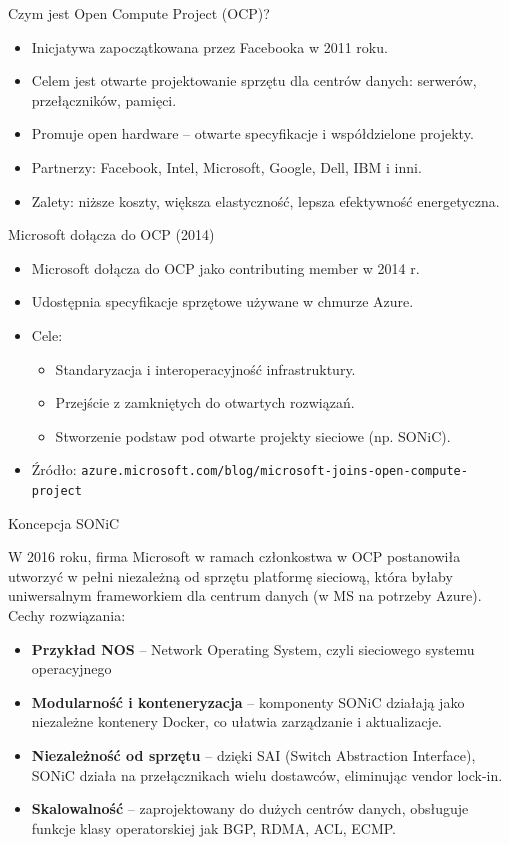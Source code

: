 \documentclass[aspectratio=169]{beamer}
\begin{document}
\begin{frame}{Czym jest Open Compute Project (OCP)?}
\begin{itemize}
    \item Inicjatywa zapoczątkowana przez Facebooka w 2011 roku.
    \item Celem jest otwarte projektowanie sprzętu dla centrów danych: serwerów, przełączników, pamięci.
    \item Promuje open hardware – otwarte specyfikacje i współdzielone projekty.
    \item Partnerzy: Facebook, Intel, Microsoft, Google, Dell, IBM i inni.
    \item Zalety: niższe koszty, większa elastyczność, lepsza efektywność energetyczna.
\end{itemize}
\end{frame}

\begin{frame}{Microsoft dołącza do OCP (2014)}
\begin{itemize}
    \item Microsoft dołącza do OCP jako contributing member w 2014 r.
    \item Udostępnia specyfikacje sprzętowe używane w chmurze Azure.
    \item Cele:
    \begin{itemize}
        \item Standaryzacja i interoperacyjność infrastruktury.
        \item Przejście z zamkniętych do otwartych rozwiązań.
        \item Stworzenie podstaw pod otwarte projekty sieciowe (np. SONiC).
    \end{itemize}
    \item Źródło: \texttt{azure.microsoft.com/blog/microsoft-joins-open-compute-project}
\end{itemize}
\end{frame}

\begin{frame}{Koncepcja SONiC}

    W 2016 roku, firma Microsoft w ramach członkostwa w OCP postanowiła utworzyć w pełni niezależną od sprzętu platformę sieciową, która byłaby uniwersalnym frameworkiem dla centrum danych (w MS na potrzeby Azure). Cechy rozwiązania:


    \begin{itemize}
    \item \textbf{Przykład NOS} -- Network Operating System, czyli sieciowego systemu operacyjnego
    \item \textbf{Modularność i konteneryzacja} -- komponenty SONiC działają jako niezależne kontenery Docker, co ułatwia zarządzanie i aktualizacje.
    \item \textbf{Niezależność od sprzętu} -- dzięki SAI (Switch Abstraction Interface), SONiC działa na przełącznikach wielu dostawców, eliminując vendor lock-in.
    \item \textbf{Skalowalność} -- zaprojektowany do dużych centrów danych, obsługuje funkcje klasy operatorskiej jak BGP, RDMA, ACL, ECMP.
  \end{itemize}
\end{frame}
\end{document}
